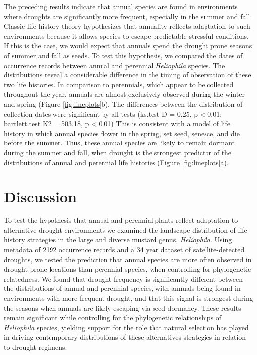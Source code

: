 \documentclass[man,floatsintext]{apa6}
\theoremstyle{definition}
\theoremstyle{definition}
\theoremstyle{definition}
\theoremstyle{remark}
\begin{document}
The preceding results indicate that annual species are found in
environments where droughts are significantly more frequent, especially
in the summer and fall. Classic life history theory hypothesizes that
annuality reflects adaptation to such environments because it allows
species to escape predictable stressful conditions. If this is the case,
we would expect that annuals spend the drought prone seasons of summer
and fall as seeds. To test this hypothesis, we compared the dates of
occurrence records between annual and perennial \emph{Heliophila}
species. The distributions reveal a considerable difference in the
timing of observation of these two life histories. In comparison to
perennials, which appear to be collected throughout the year, annuals
are almost exclusively observed during the winter and spring (Figure
\ref{fig:lineplots}b). The differences between the distribution of
collection dates were significant by all tests (ks.test D = 0.25, p
\textless{} 0.01; bartlett.test K2 = 503.18, p \textless{} 0.01) This is
consistent with a model of life history in which annual species flower
in the spring, set seed, senesce, and die before the summer. Thus, these
annual species are likely to remain dormant during the summer and fall,
when drought is the strongest predictor of the distributions of annual
and perennial life histories (Figure \ref{fig:lineplots}a).

\hypertarget{discussion}{%
\section{Discussion}\label{discussion}}

To test the hypothesis that annual and perennial plants reflect
adaptation to alternative drought environments we examined the landscape
distribution of life history strategies in the large and diverse mustard
genus, \emph{Heliophila}. Using metadata of 2192 occurrence records and
a 34 year dataset of satellite-detected droughts, we tested the
prediction that annual species are more often observed in drought-prone
locations than perennial species, when controlling for phylogenetic
relatedness. We found that drought frequency is significantly different
between the distributions of annual and perennial species, with annuals
being found in environments with more frequent drought, and that this
signal is strongest during the seasons when annuals are likely escaping
via seed dormancy. These results remain significant while controlling
for the phylogenetic relationships of \emph{Heliophila} species,
yielding support for the role that natural selection has played in
driving contemporary distributions of these alternatives strategies in
relation to drought regimens.
\end{document}
